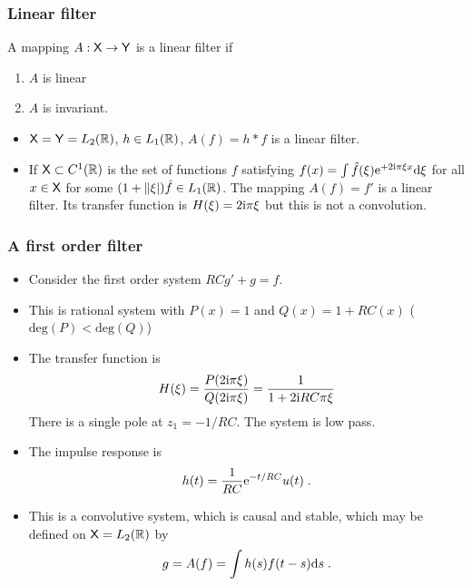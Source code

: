 \begin{frame}
\frametitle{Linear filter}
\begin{definition}
A mapping $A: \mathsf{X} \to \mathsf{Y}$ is a \alert{linear filter} if 
\begin{enumerate}
\item $A$ is linear 
\item $A$ is invariant. 
\end{enumerate}
\end{definition}
\begin{itemize}
\item $\mathsf{X}= \mathsf{Y}= L_2(\mathbb{R})$, $h \in L_1(\mathbb{R})$, $A(f)= h * f$ is a linear filter.
\item If $\mathsf{X} \subset C^1(\mathbb{R})$ is the set of functions $f$ satisfying $f(x)= \int \hat{f}(\xi) \mathrm{e}^{+ 2 \mathrm{i} \pi \xi x} \mathrm{d} \xi$ for all $x \in \mathsf{X}$ for some $(1 + \|\xi|) \hat{f} \in L_1(\mathbb{R})$. The mapping $A(f)= f'$ is a linear filter. Its transfer function is $H(\xi)= 2 \mathrm{i} \pi \xi$ but this is not a \alert{convolution}.
\end{itemize}
\end{frame}

\begin{frame}
\frametitle{A first order filter}
\begin{itemize}
\item Consider the first order system $RC g' + g = f$. 
\item This is rational system with $P(x)= 1$ and $Q(x)= 1 + RC(x)$ ($\mathrm{deg}(P) < \mathrm{deg}(Q)$)
\item The \alert{transfer function} is 
\[
H(\xi)= \frac{P(2 \mathrm{i} \pi \xi)}{Q(2 \mathrm{i} \pi \xi)}= \frac{1}{1 + 2 \mathrm{i} RC \pi \xi }
\]
There is a \alert{single pole} at $z_1= -1/RC$. The system is \alert{low pass}.
\item The \alert{impulse response} is 
\[
h(t)= \frac{1}{RC} \mathrm{e}^{-t/RC} u(t) \;.
\] 
\item This is a convolutive system, which is causal and stable, which may be defined on $\mathsf{X} = L_2(\mathbb{R})$ by
\[
g= A(f)= \int h(s) f(t-s) \mathrm{d} s \;.
\]
\end{itemize}
\end{frame}
